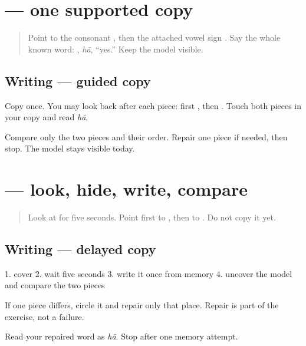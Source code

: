 \section[hā]{ — one supported copy}

\label{lesson:GU-W01-haa-guided-copy}



\begin{quote}
Point to the consonant \textbf{}, then the attached vowel sign \textbf{}. Say the whole known word: \textbf{}, \emph{hā}, \textquotedblleft{}yes.\textquotedblright{} Keep the model visible.
\end{quote}

\subsection*{Writing — guided copy}
Copy \textbf{} once. You may look back after each piece: first \textbf{}, then \textbf{}. Touch both pieces in your copy and read \emph{hā}.

\begin{tcolorbox}[breakable,colback=teal!4,colframe=teal!35!black,title={Before you move on}]
Compare only the two pieces and their order. Repair one piece if needed, then stop. The model stays visible today.
\end{tcolorbox}
\section[hā]{ — look, hide, write, compare}

\label{lesson:GU-W01-haa-delayed-copy}



\begin{quote}
Look at \textbf{} for five seconds. Point first to \textbf{}, then to \textbf{}. Do not copy it yet.
\end{quote}

\subsection*{Writing — delayed copy}
1. cover \textbf{} 2. wait five seconds 3. write it once from memory 4. uncover the model and compare the two pieces

If one piece differs, circle it and repair only that place. Repair is part of the exercise, not a failure.

\begin{tcolorbox}[breakable,colback=teal!4,colframe=teal!35!black,title={Before you move on}]
Read your repaired word as \emph{hā}. Stop after one memory attempt.
\end{tcolorbox}
